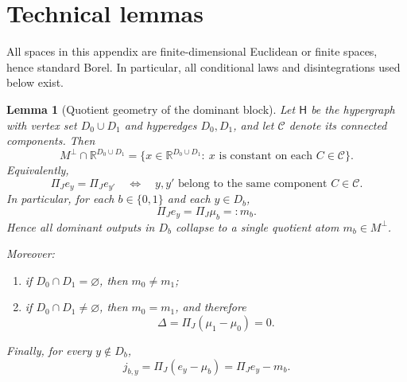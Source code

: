 \documentclass{article}
\newtheorem{lemma}[theorem]{Lemma}
\newcommand{\1}{\mathbf 1}
\begin{document}
\appendix
\section{Technical lemmas}
\label{app:technical-lemmas}

All spaces in this appendix are finite-dimensional Euclidean or finite spaces, hence standard Borel. In particular,
all conditional laws and disintegrations used below exist.

\begin{lemma}[Quotient geometry of the dominant block]
\label{lem:new-geometry}
Let $\mathsf H$ be the hypergraph with vertex set $D_0\cup D_1$ and hyperedges $D_0,D_1$, and let $\mathcal C$
denote its connected components. Then
\[
M^\perp\cap \mathbb R^{D_0\cup D_1}
=
\{x\in \mathbb R^{D_0\cup D_1}:\ x \text{ is constant on each } C\in\mathcal C\}.
\]
Equivalently,
\[
\Pi_J e_y=\Pi_J e_{y'}
\quad\Longleftrightarrow\quad
y,y' \text{ belong to the same component } C\in\mathcal C.
\]
In particular, for each $b\in\{0,1\}$ and each $y\in D_b$,
\[
\Pi_J e_y=\Pi_J\mu_b=:m_b.
\]
Hence all dominant outputs in $D_b$ collapse to a single quotient atom $m_b\in M^\perp$.

Moreover:
\begin{enumerate}
\item[(a)] if $D_0\cap D_1=\varnothing$, then $m_0\neq m_1$;
\item[(b)] if $D_0\cap D_1\neq\varnothing$, then $m_0=m_1$, and therefore
\[
\Delta=\Pi_J(\mu_1-\mu_0)=0.
\]
\end{enumerate}
Finally, for every $y\notin D_b$,
\[
j_{b,y}=\Pi_J(e_y-\mu_b)=\Pi_J e_y-m_b.
\]
\end{lemma}
\end{document}
